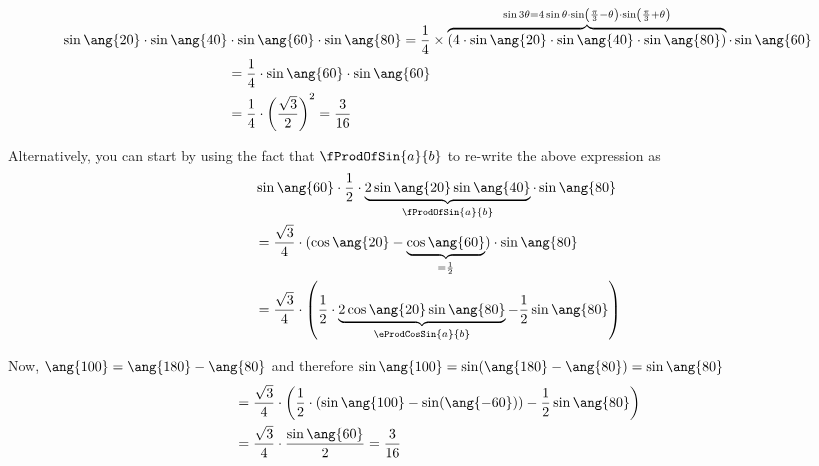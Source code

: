 \begin{solution}[\halfpage]
	\begin{fullwidth}
    \begin{align}
       \sin\ang{\vbone}\cdot\sin\ang{\vbtwo}&\cdot\sin\ang{\vbthree}\cdot\sin\ang{\vbfour} = 
       \dfrac{1}{4}\times\overbrace{(4\cdot\sin\ang{\vbone}\cdot\sin\ang{\vbtwo}\cdot\sin\ang{\vbfour})}
       ^{\sin 3\theta = 4\sin\theta\cdot\sin\left( \frac{\pi}{3} - \theta\right)\cdot\sin\left(\frac{\pi}{3} +
        \theta\right)}\cdot\sin\ang{\vbthree} \\
       &= \dfrac{1}{4}\cdot\sin\ang{\vbthree}\cdot\sin\ang{\vbthree} \\
       &= \dfrac{1}{4}\cdot\left(\vbsix \right)^2 = \vbfive
    \end{align}
    
    Alternatively, you can start by using the fact that $\fProdOfSin{a}{b}$ to re-write the above expression as
    \begin{align}
    	&\sin\ang{\vbthree}\cdot\dfrac{1}{2}\cdot \underbrace{2\sin\ang{\vbone}\sin\ang{\vbtwo}}_{\fProdOfSin{a}{b}}\cdot\sin\ang{\vbfour} \\
    	&= \dfrac{\sqrt{3}}{4}\cdot(\cos\ang{\vbone}-\underbrace{\cos\ang{\vbthree}}_{= \frac{1}{2}})\cdot\sin\ang{\vbfour} \\
    	&= \dfrac{\sqrt{3}}{4}\cdot\left(\dfrac{1}{2}\cdot \underbrace{2\cos\ang{\vbone}\sin\ang{\vbfour}}
    	_{\eProdCosSin{a}{b}} - \dfrac{1}{2}\sin\ang{\vbfour}\right)
    \end{align}
    
    Now, $ \ang{\vbseven} = \ang{180}-\ang{\vbfour}$ and therefore $\sin\ang{\vbseven} =
     \sin(\ang{180}-\ang{\vbfour}) = \sin\ang{\vbfour}$
    \begin{align}
    	&= \dfrac{\sqrt{3}}{4}\cdot\left( \dfrac{1}{2}\cdot(\sin\ang{\vbseven} - \sin(\ang{-\vbthree}))
    	-\dfrac{1}{2}\sin\ang{\vbfour}\right) \\
    	&= \dfrac{\sqrt{3}}{4}\cdot\dfrac{\sin\ang{\vbthree}}{2} = \vbfive
    \end{align}
    \end{fullwidth}
\end{solution}

